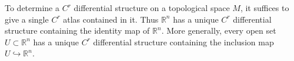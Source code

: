 To determine a $C^r$ differential structure on a topological space $M$, it suffices to give a single $C^r$ atlas contained in it. Thus $\mathbb{R}^n$ has a unique $C^r$ differential structure containing the identity map of $\mathbb{R}^n$. More generally, every open set $U \subset \mathbb{R}^n$ has a unique $C^r$ differential structure containing the inclusion map $U \hookrightarrow \mathbb{R}^n$.

